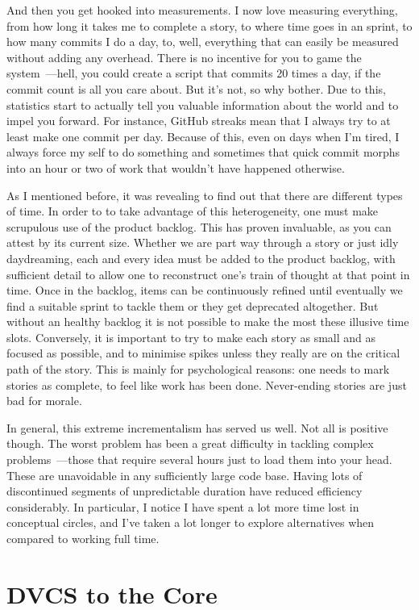 \documentclass{book}
\begin{document}
And then you get hooked into measurements. I now love measuring
everything, from how long it takes me to complete a story, to where
time goes in an sprint, to how many commits I do a day, to, well,
everything that can easily be measured without adding any
overhead. There is no incentive for you to game the system~---hell, you
could create a script that commits 20 times a day, if the commit count
is all you care about. But it's not, so why bother. Due to this,
statistics start to actually tell you valuable information about the
world and to impel you forward. For instance, GitHub streaks mean that
I always try to at least make one commit per day. Because of this,
even on days when I'm tired, I always force my self to do something
and sometimes that quick commit morphs into an hour or two of work
that wouldn't have happened otherwise.

As I mentioned before, it was revealing to find out that there are
different types of time. In order to to take advantage of this
heterogeneity, one must make scrupulous use of the product
backlog. This has proven invaluable, as you can attest by its current
size. Whether we are part way through a story or just idly
daydreaming, each and every idea must be added to the product backlog,
with sufficient detail to allow one to reconstruct one's train of
thought at that point in time. Once in the backlog, items can be
continuously refined until eventually we find a suitable sprint to
tackle them or they get deprecated altogether. But without an healthy
backlog it is not possible to make the most these illusive time
slots. Conversely, it is important to try to make each story as small
and as focused as possible, and to minimise spikes unless they really
are on the critical path of the story. This is mainly for
psychological reasons: one needs to mark stories as complete, to feel
like work has been done. Never-ending stories are just bad for morale.

In general, this extreme incrementalism has served us well. Not all is
positive though. The worst problem has been a great difficulty in
tackling complex problems~---those that require several hours just to
load them into your head. These are unavoidable in any sufficiently
large code base. Having lots of discontinued segments of unpredictable
duration have reduced efficiency considerably. In particular, I notice
I have spent a lot more time lost in conceptual circles, and I've
taken a lot longer to explore alternatives when compared to working
full time.

\section{DVCS to the Core}
\end{document}
